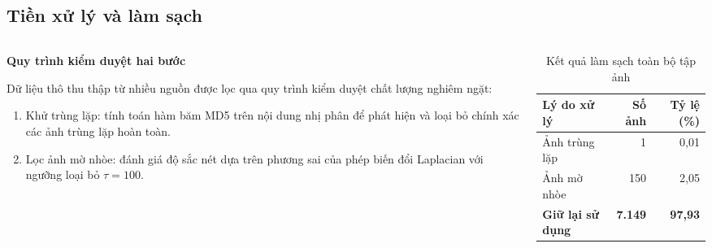 \subsection{Tiền xử lý và làm sạch}
\begin{frame}
    \begin{columns}[T]
        \begin{column}{0.48\textwidth}
            \centerline{\textbf{Quy trình kiểm duyệt hai bước}}
            \vspace{0.2cm}
            \footnotesize
            \justifying
            Dữ liệu thô thu thập từ nhiều nguồn được lọc qua quy trình kiểm duyệt chất lượng nghiêm ngặt:
            \begin{enumerate}
                \setlength{\itemsep}{3pt}
                \item Khử trùng lặp: tính toán hàm băm MD5 trên nội dung nhị phân để phát hiện và loại bỏ chính xác các ảnh trùng lặp hoàn toàn.
                \item Lọc ảnh mờ nhòe: đánh giá độ sắc nét dựa trên phương sai của phép biến đổi Laplacian với ngưỡng loại bỏ $\tau = 100$.
            \end{enumerate}
        \end{column}
        \begin{column}{0.48\textwidth}
            \centering
            \vspace{0.2cm}
            \begin{table}[h]
                \centering
                \caption{Kết quả làm sạch toàn bộ tập ảnh}
                \label{tab:slide_clean_summary}
                \footnotesize
                \setlength{\tabcolsep}{5pt}
                \begin{tabular}{lrr}
                    \toprule
                    Lý do xử lý              & Số ảnh         & Tỷ lệ (\%)     \\
                    \midrule
                    Ảnh trùng lặp            & 1              & 0,01           \\
                    Ảnh mờ nhòe              & 150            & 2,05           \\
                    \textbf{Giữ lại sử dụng} & \textbf{7.149} & \textbf{97,93} \\
                    \bottomrule
                \end{tabular}
            \end{table}
        \end{column}
    \end{columns}
\end{frame}

